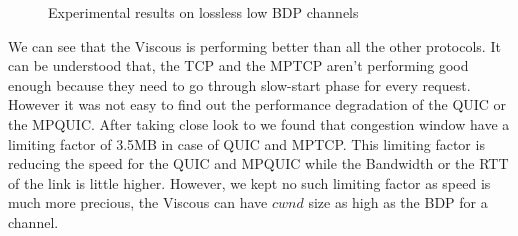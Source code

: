 \begin{figure}
	\captionsetup[subfigure]{}
	\begin{center}
		\caption{\label{fig:benefit}Experimental results on lossless low BDP channels}
	\end{center}
\end{figure}

We can see that the Viscous is performing better than all the other protocols. It can be understood that, the TCP and the MPTCP aren't performing good enough because they need to go through slow-start phase for every request. However it was not easy to find out the performance degradation of the QUIC or the MPQUIC. After taking close look to we found that congestion window have a limiting factor of 3.5MB in case of QUIC and MPTCP. This limiting factor is reducing the speed for the QUIC and MPQUIC while the Bandwidth or the RTT of the link is little higher. However, we kept no such limiting factor as speed is much more precious, the Viscous can have $cwnd$ size as high as the BDP for a channel.

